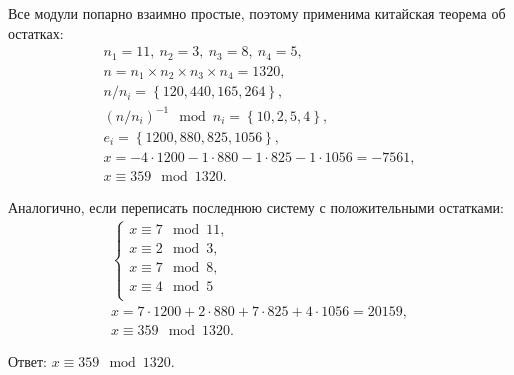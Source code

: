Все модули попарно взаимно простые, поэтому применима китайская теорема об остатках:
\[\begin{array}{l}
	n_1 = 11, ~ n_2 = 3, ~ n_3 = 8, ~ n_4 = 5, \\
	n = n_1 \times n_2 \times n_3 \times n_4 = 1320, \\
	n / n_i  = \left\{ 120, 440, 165, 264 \right\}, \\
	\left( n / n_i \right)^{-1} \mod n_i = \left\{ 10, 2, 5, 4 \right\}, \\
	e_i = \left\{ 1200, 880, 825, 1056 \right\}, \\
	x = -4 \cdot 1200 - 1 \cdot 880 - 1 \cdot 825 - 1 \cdot 1056 = -7561, \\
	x \equiv 359 \mod 1320.
\end{array}\]

Аналогично, если переписать последнюю систему с положительными остатками:
\[\begin{array}{l}
	\begin{cases}
		x \equiv 7 \mod 11, \\
		x \equiv 2 \mod 3, \\
		x \equiv 7 \mod 8, \\
		x \equiv 4 \mod 5 \\
	\end{cases} \\
	x = 7 \cdot 1200 + 2 \cdot 880 + 7 \cdot 825 + 4 \cdot 1056 = 20159, \\
	x \equiv 359 \mod 1320.
\end{array}\]

Ответ: $x \equiv 359 \mod 1320$.
\exampleend

